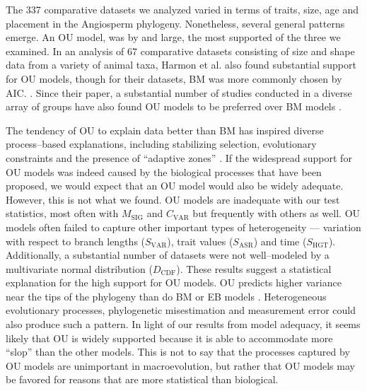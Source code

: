 \documentclass[a4paper,11pt]{article}
\begin{document}
The 337 comparative datasets we analyzed varied in terms of traits, size, age and placement in the Angiosperm phylogeny. Nonetheless, several general patterns emerge. An OU model, was by and large, the most supported of the three we examined. In an analysis of 67 comparative datasets consisting of size and shape data from a variety of animal taxa, Harmon et al. \citep{Harmon2010} also found substantial support for OU models, though for their datasets, BM was more commonly chosen by AIC. \citep[We note, however, that many of their datasets were quite small; see][]{SlaterPennell}. Since their paper, a substantial number of studies conducted in a diverse array of groups have also found OU models to be preferred over BM models \citep[e.g.,][]{Burbrink2012, Wiens2013, Lopez2013, Thomaspreprint}. 

The tendency of OU to explain data better than BM has inspired diverse process--based explanations, including stabilizing selection, evolutionary constraints and the presence of ``adaptive zones'' \citep{HansenMartins1996, ButlerKing2004, Hansen2012book, PennellHarmon}. 
If the widespread support for OU models was indeed caused by the biological processes that have been proposed, we would expect that an OU model would also be widely adequate. However, this is not what we found. OU models are inadequate with our test statistics, most often with $M_{\text{SIG}}$ and $C_{\text{VAR}}$ but frequently with others as well. OU models often failed to capture other important types of heterogeneity --- variation with respect to branch lengths ($S_{\text{VAR}}$), trait values ($S_{\text{ASR}}$) and time ($S_{\text{HGT}}$). Additionally, a substantial number of datasets were not well--modeled by a multivariate normal distribution ($D_{\text{CDF}}$). These results suggest a statistical explanation for the high support for OU models. OU predicts higher variance near the tips of the phylogeny than do BM or EB models \citep[see figure 1 in][]{Harmon2010}. Heterogeneous evolutionary processes, phylogenetic misestimation and measurement error could also produce such a pattern. In light of our results from model adequacy, it seems likely that OU is widely supported because it is able to accommodate more ``slop'' than the other models.  This is not to say that the processes captured by OU models are unimportant in macroevolution, but rather that OU models may be favored for reasons that are more statistical than biological.
\end{document}
